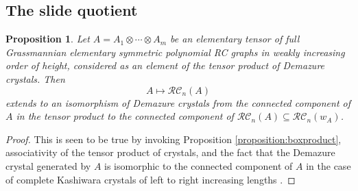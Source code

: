 \documentclass{amsart}
\newtheorem{corollary}[lemma]{Corollary}
\newtheorem{proposition}[lemma]{Proposition}
\theoremstyle{definition}
\theoremstyle{remark}
\numberwithin{equation}{subsection}
\newcommand{\wof}[1]{w_{#1}}
\newcommand{\RC}{\mathcal{RC}}
\newcommand{\maxd}{\mathfrak{m}}
\begin{document}
\subsection{The slide quotient}



\begin{proposition}\label{proposition:liftcrystaliso}
Let $A = A_1\otimes\cdots \otimes A_m$ be an elementary tensor of full Grassmannian elementary symmetric polynomial RC graphs in weakly increasing order of height, considered as an element of the tensor product of Demazure crystals. Then 
$$A\mapsto\RC_n(A)$$
extends to an isomorphism of Demazure crystals from the connected component of $A$ in the tensor product to the connected component of $\RC_n(A)\subseteq \RC_n(\wof{A})$.
\end{proposition}
\begin{proof}
This is seen to be true by invoking Proposition \ref{proposition:boxproduct}, associativity of the tensor product of crystals, and the fact that the Demazure crystal generated by $A$ is isomorphic to the connected component of $A$ in the case of complete Kashiwara crystals of left to right increasing lengths \cite{kouno2020decomposition}.
\end{proof}

\end{document}
